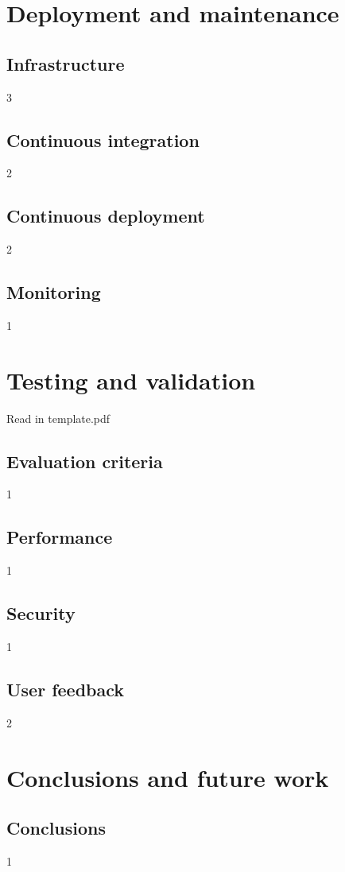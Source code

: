 \documentclass[12pt,a4paper]{report}
\begin{document}
\chapter{Deployment and maintenance}
\section{Infrastructure}
3

\section{Continuous integration}
2

\section{Continuous deployment}
2

\section{Monitoring}
1



\chapter{Testing and validation}
Read in template.pdf
\section{Evaluation criteria}
1

\section{Performance}
1

\section{Security}
1

\section{User feedback}
2



\chapter{Conclusions and future work}
\section{Conclusions}
1
\end{document}
